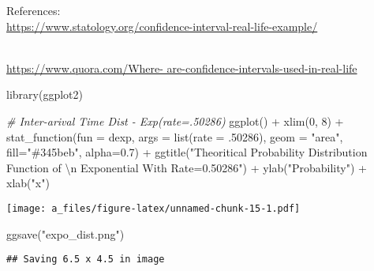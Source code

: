 \documentclass[
]{article}
\newenvironment{Shaded}{\begin{snugshade}}{\end{snugshade}}
\newcommand{\AttributeTok}[1]{\textcolor[rgb]{0.77,0.63,0.00}{#1}}
\newcommand{\CommentTok}[1]{\textcolor[rgb]{0.56,0.35,0.01}{\textit{#1}}}
\newcommand{\DecValTok}[1]{\textcolor[rgb]{0.00,0.00,0.81}{#1}}
\newcommand{\FloatTok}[1]{\textcolor[rgb]{0.00,0.00,0.81}{#1}}
\newcommand{\FunctionTok}[1]{\textcolor[rgb]{0.00,0.00,0.00}{#1}}
\newcommand{\NormalTok}[1]{#1}
\newcommand{\SpecialCharTok}[1]{\textcolor[rgb]{0.00,0.00,0.00}{#1}}
\newcommand{\StringTok}[1]{\textcolor[rgb]{0.31,0.60,0.02}{#1}}
\begin{document}
References:\\
\url{https://www.statology.org/confidence-interval-real-life-example/}\strut \\
\href{https://www.statology.org/confidence-interval-real-life-example/}{https://www.quora.com/Where-
are-confidence-intervals-used-in-real-life}

\begin{Shaded}
\begin{Highlighting}[]
\FunctionTok{library}\NormalTok{(ggplot2)}

\CommentTok{\# Inter{-}arival Time Dist {-} Exp(rate=.50286)}
\FunctionTok{ggplot}\NormalTok{() }\SpecialCharTok{+}
  \FunctionTok{xlim}\NormalTok{(}\DecValTok{0}\NormalTok{, }\DecValTok{8}\NormalTok{) }\SpecialCharTok{+}
  \FunctionTok{stat\_function}\NormalTok{(}\AttributeTok{fun =}\NormalTok{ dexp,}
                \AttributeTok{args =} \FunctionTok{list}\NormalTok{(}\AttributeTok{rate =}\NormalTok{ .}\DecValTok{50286}\NormalTok{),}
                \AttributeTok{geom =} \StringTok{"area"}\NormalTok{,}
                \AttributeTok{fill=}\StringTok{"\#345beb"}\NormalTok{, }\AttributeTok{alpha=}\FloatTok{0.7}\NormalTok{) }\SpecialCharTok{+}
  \FunctionTok{ggtitle}\NormalTok{(}\StringTok{"Theoritical Probability Distribution Function of }\SpecialCharTok{\textbackslash{}n}\StringTok{ Exponential With Rate=0.50286"}\NormalTok{) }\SpecialCharTok{+}
  \FunctionTok{ylab}\NormalTok{(}\StringTok{"Probability"}\NormalTok{) }\SpecialCharTok{+}
  \FunctionTok{xlab}\NormalTok{(}\StringTok{"x"}\NormalTok{)}
\end{Highlighting}
\end{Shaded}

\texttt{[image: a\_files/figure-latex/unnamed-chunk-15-1.pdf]}

\begin{Shaded}
\begin{Highlighting}[]
\FunctionTok{ggsave}\NormalTok{(}\StringTok{"expo\_dist.png"}\NormalTok{)}
\end{Highlighting}
\end{Shaded}

\begin{verbatim}
## Saving 6.5 x 4.5 in image
\end{verbatim}
\end{document}
